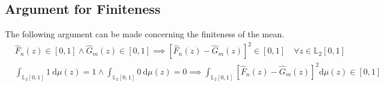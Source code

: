 \documentclass[12pt, a4paper]{article}
\theoremstyle{MAstyle} \newtheorem{assumption}{Assumption}[section]
\theoremstyle{MAstyle} \newtheorem{definition}{Definition}[section]
\theoremstyle{MAstyle} \newtheorem{theorem}{Theorem}[section]
\begin{document}
		\subsection{Argument for Finiteness}\label{finiteness}
		The following argument can be made concerning the finiteness of the mean.
		\begin{equation}
			\begin{split}
				& \hat{F}_n(z) \in [0,1] 	\land \hat{G}_m(z) \in [0,1] \implies \left[\hat{F}_n(z) - \hat{G}_m(z)\right]^2 \in [0,1] \quad \forall z \in \mathbb{L}_2[0,1]\\
				& \int_{\mathbb{L}_2[0,1]} 1 \ \mathrm{d}\mu(z) = 1 \land \int_{\mathbb{L}_2[0,1]} 0 \ \mathrm{d}\mu(z) = 0 \implies \int_{\mathbb{L}_2[0,1]}\left[\hat{F}_n(z) - \hat{G}_m(z)\right]^2 \mathrm{d}\mu(z) \in [0,1]
			\end{split}
		\end{equation}			 
	
\end{document}
